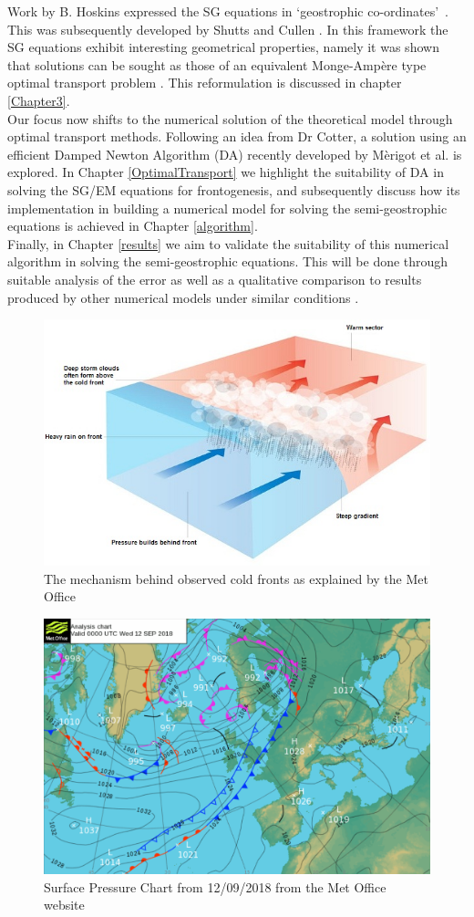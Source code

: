 Work by B. Hoskins expressed the SG equations in \textquoteleft geostrophic co-ordinates\textquoteright \ \cite{Hoskins1972}. This was subsequently developed by Shutts and Cullen \cite{Shutts1987}. In this framework the SG equations exhibit interesting geometrical properties, namely it was shown that solutions can be sought as those of an equivalent Monge-Amp\`{e}re type optimal transport problem \cite{Cullen2006a}. This reformulation is discussed in chapter \ref{Chapter3}.
\\
\linebreak
Our focus now shifts to the numerical solution of the theoretical model through optimal transport methods. Following an idea from Dr Cotter, a solution using an efficient Damped Newton Algorithm (DA) recently developed by M\`{e}rigot et al. \cite{Merigot2017, Merigot2017a, Kitagawa2016} is explored. In Chapter \ref{OptimalTransport} we highlight the suitability of DA in solving the SG/EM equations for frontogenesis, and subsequently discuss how its implementation in building a numerical model for solving the semi-geostrophic equations is achieved in Chapter \ref{algorithm}.
\\
\linebreak
Finally, in Chapter \ref{results} we aim to validate the suitability of this numerical algorithm in solving the semi-geostrophic equations. This will be done through suitable analysis of the error as well as a qualitative comparison to results produced by other numerical models under similar conditions \cite{Nakamura1994,Cullen1993}.
\begin{figure}[h]
	\centering
	\includegraphics[width=0.5\linewidth]{introduction/figure-8-cold-front(image)}
	\caption[Cold Front]{The mechanism behind observed cold fronts as explained by the Met Office \cite{MetOffice2018}}
	\label{fig:figure-8-cold-frontimage}
\end{figure}
\begin{figure}[h]
	\centering
	\includegraphics[width=0.5\linewidth]{introduction/surface_pressure}
	\caption[Surface Pressure Chart from 12/09/2018]{Surface Pressure Chart from 12/09/2018 from the Met Office website \cite{MetOffice2018a}}
	\label{fig:surfacepressure}
\end{figure}
